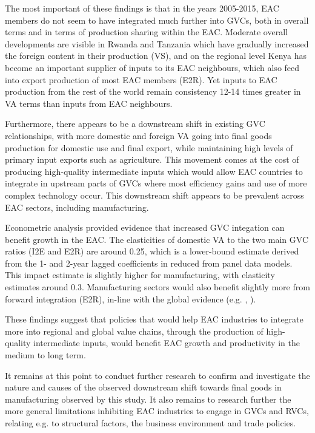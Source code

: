 \documentclass[a4paper]{article}
\begin{document}
The most important of these findings is that in the years 2005-2015, EAC members do not seem to have integrated much further into GVCs, both in overall terms and in terms of production sharing within the EAC. Moderate overall developments are visible in Rwanda and Tanzania which have gradually increased the foreign content in their production (VS), and on the regional level Kenya has become an important supplier of inputs to its EAC neighbours, which also feed into export production of most EAC members (E2R). Yet inputs to EAC production from the rest of the world remain consistency 12-14 times greater in VA terms than inputs from EAC neighbours. \newline

Furthermore, there appears to be a downstream shift in existing GVC relationships, with more domestic and foreign VA going into final goods production for domestic use and final export, while maintaining high levels of primary input exports such as agriculture. This movement comes at the cost of producing high-quality intermediate inputs which would allow EAC countries to integrate in upstream parts of GVCs where most efficiency gains and use of more complex technology occur. This downstream shift appears to be prevalent across EAC sectors, including manufacturing. \newline

Econometric analysis provided evidence that increased GVC integation can benefit growth in the EAC. The elasticities of domestic VA to the two main GVC ratios  (I2E and E2R) are around 0.25, which is a lower-bound estimate derived from the 1- and 2-year lagged coefficients in reduced from panel data models.  This impact estimate is slightly higher for manufacturing, with elasticity estimates around 0.3. Manufacturing sectors would also benefit slightly more from forward integration (E2R), in-line with the global evidence (e.g.  \citet{Kummritz20161}, \citet{kummritz2015global}). \newline

These findings suggest that policies that would help EAC industries to integrate more into regional and global value chains, through the production of high-quality intermediate inputs, would benefit EAC growth and productivity in the medium to long term. \newline 

It remains at this point to conduct further research to confirm and investigate the nature and causes of the observed downstream shift towards final goods in manufacturing observed by this study. It also remains to research further the more general limitations inhibiting EAC industries to engage in GVCs and RVCs, relating e.g. to structural factors, the business environment and trade policies. \newline
\end{document}

